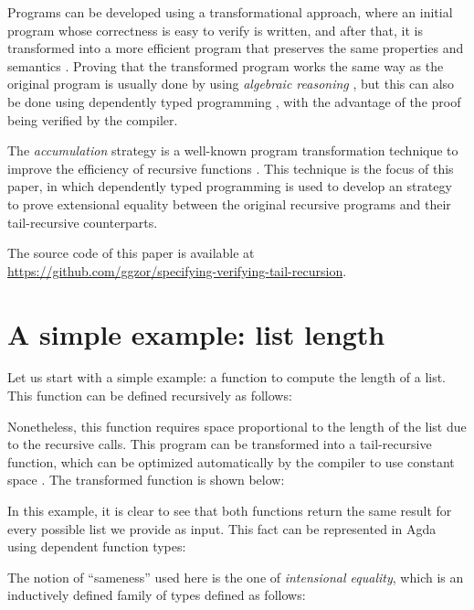 \documentclass[runningheads]{llncs}
\begin{document}
Programs can be developed using a transformational approach, where an initial program
whose correctness is easy to verify is written, and after that, it is transformed into a
more efficient program that preserves the same properties and semantics
\cite{pettorossi1993rules}. Proving that the transformed program works the same way as
the original program is usually done by using \emph{algebraic reasoning}
\cite{bird1996algebra}, but this can also be done using dependently typed programming
\cite{mu2008algebra}, with the advantage of the proof being verified by the compiler.

The \emph{accumulation} strategy is a well-known program transformation technique to
improve the efficiency of recursive functions \cite{bird1984promotion}. This technique is
the focus of this paper, in which dependently typed programming is used to develop an
strategy to prove extensional equality between the original recursive programs and their
tail-recursive counterparts.

The source code of this paper is available at
\url{https://github.com/ggzor/specifying-verifying-tail-recursion}.

\section{A simple example: list length}

Let us start with a simple example: a function to compute the length of a list. This
function can be defined recursively as follows:



Nonetheless, this function requires space proportional to the length of the list due to
the recursive calls. This program can be transformed into a tail-recursive function,
which can be optimized automatically by the compiler to use constant space
\cite{bauer2003compilation}. The transformed function is shown below:



In this example, it is clear to see that both functions return the same result for every
possible list we provide as input. This fact can be represented in Agda using dependent
function types:



The notion of ``sameness'' used here is the one of \emph{intensional equality}, which is
an inductively defined family of types \cite{dybjer1994inductive,mu2008algebra} defined
as follows:
\end{document}
